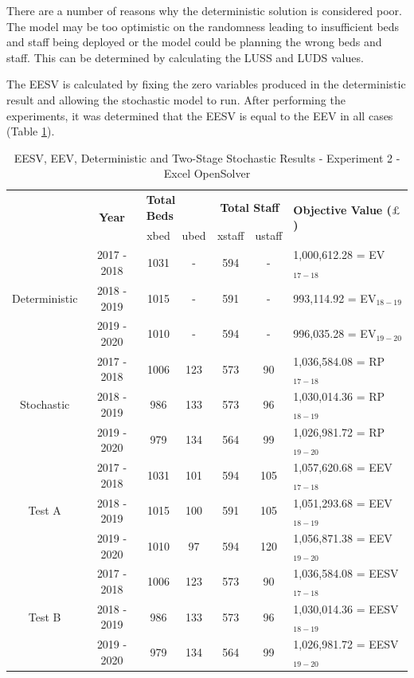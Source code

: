 \documentclass[../thesis.tex]{subfiles}
\begin{document}
There are a number of reasons why the deterministic solution is considered poor. The model may be too optimistic on the randomness leading to insufficient beds and staff being deployed or the model could be planning the wrong beds and staff. This can be determined by calculating the LUSS and LUDS values.

The EESV is calculated by fixing the zero variables produced in the deterministic result and allowing the stochastic model to run. After performing the experiments, it was determined that the EESV is equal to the EEV in all cases (Table \ref{tab:eesveevdetstocresults2}).

\begin{table}[h!]
    \centering
    \begin{tabular}{ccccccl}\toprule
 & \multirow{2}{*}{\textbf{Year}}& \multicolumn{2}{l}{\textbf{Total Beds}} & \multicolumn{2}{c}{\textbf{Total Staff}} & \multirow{2}{*}{\textbf{Objective Value ($\pounds$)}}\\ \cmidrule(lr){3-4} \cmidrule(lr){5-6}
&& xbed           & ubed          & xstaff         & ustaff         \\ \midrule
     \multirow{3}{*}{Deterministic} & 2017 - 2018 & 1031 & - &  594 & - & 1,000,612.28 =  EV$_{17-18}$ \\ 
      & 2018 - 2019 & 1015 & - & 591 & - & 993,114.92 =  EV$_{18-19}$ \\
      & 2019 - 2020 & 1010 & - & 594 & - & 996,035.28 =  EV$_{19-20}$\\ \midrule
     \multirow{3}{*}{Stochastic} & 2017 - 2018 & 1006 & 123 & 573 & 90 & 1,036,584.08 =  RP$_{17-18}$ \\ 
      & 2018 - 2019 & 986 & 133 & 573 & 96 & 1,030,014.36 =  RP$_{18-19}$ \\
      & 2019 - 2020 & 979 & 134 & 564 & 99 & 1,026,981.72 =  RP$_{19-20}$\\ \midrule    
     \multirow{3}{*}{Test A} & 2017 - 2018 & 1031 & 101 & 594 & 105 & 1,057,620.68 =  EEV$_{17-18}$ \\ 
      & 2018 - 2019 & 1015 & 100 & 591 & 105 &  1,051,293.68 =  EEV$_{18-19}$ \\
      & 2019 - 2020 & 1010 & 97 & 594 & 120 & 1,056,871.38 =  EEV$_{19-20}$\\  \midrule  
     \multirow{3}{*}{Test B} &  2017 - 2018 & 1006 & 123 & 573 & 90 & 1,036,584.08 =    EESV$_{17-18}$ \\ 
      & 2018 - 2019 & 986 & 133 & 573 & 96 & 1,030,014.36 =   EESV$_{18-19}$ \\
      & 2019 - 2020 & 979 & 134 & 564 & 99 & 1,026,981.72 =  EESV$_{19-20}$\\ \bottomrule   
    \end{tabular}
    \caption{EESV, EEV, Deterministic and Two-Stage Stochastic Results - Experiment 2 - Excel OpenSolver}
    \label{tab:eesveevdetstocresults2}
\end{table}
\end{document}
